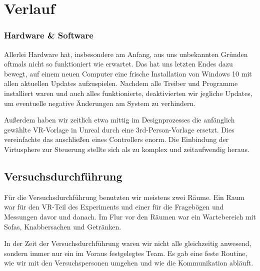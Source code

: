 \documentclass{Bericht}
\begin{document}
\maketitle


\tableofcontents
\clearpage



\section{Verlauf} %
	




		
		\subsubsection{Hardware \& Software}
			Allerlei Hardware hat, insbesondere am Anfang, aus uns unbekannten Gründen oftmals nicht so funktioniert wie erwartet. Das hat uns letzten Endes dazu bewegt, auf einem neuen Computer eine frische Installation von Windows 10 mit allen aktuellen Updates aufzuspielen. Nachdem alle Treiber und Programme installiert waren und auch alles funktionierte, deaktivierten wir jegliche Updates, um eventuelle negative Änderungen am System zu verhindern. 
			
			Außerdem haben wir zeitlich etwa mittig im Designprozesses die anfänglich gewählte VR-Vorlage in Unreal durch eine 3rd-Person-Vorlage ersetzt. Dies vereinfachte das anschließen eines Controllers enorm. Die Einbindung der Virtusphere zur Steuerung stellte sich als zu komplex und zeitaufwendig heraus. 
		
	\subsection{Versuchsdurchführung} %
		Für die Versuchsdurchführung benutzten wir meistens zwei Räume. Ein Raum war für den VR-Teil des Experiments und einer für die Fragebögen und Messungen davor und danach. Im Flur vor den Räumen war ein Wartebereich mit Sofas, Knabbersachen und Getränken. 
		
		In der Zeit der Versuchsdurchführung waren wir nicht alle gleichzeitig anwesend, sondern immer nur ein im Voraus festgelegtes Team. Es gab eine feste Routine, wie wir mit den Versuchspersonen umgehen und wie die Kommunikation abläuft. 		
\end{document}
